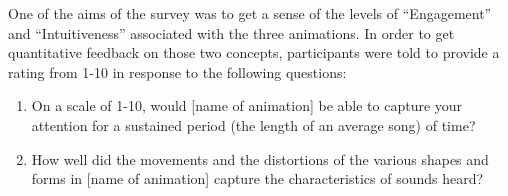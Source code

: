 \documentclass[../initial_thesis.tex]{subfiles}
\begin{document}


One of the aims of the survey was to get a sense of the levels of ``Engagement'' and ``Intuitiveness'' associated with the three animations. In order to get quantitative feedback on those two concepts, participants were told to provide a rating from 1-10 in response to the following questions:

\begin{enumerate}
\item {On a scale of 1-10, would [name of animation] be able to capture your attention for a sustained period (the length of an average song) of time?}
\item {How well did the movements and the distortions of the various shapes and forms in [name of animation] capture the characteristics of sounds heard?}
\end{enumerate}
\end{document}
